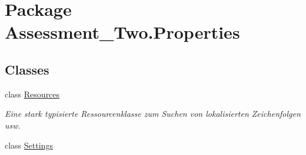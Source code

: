 \hypertarget{namespace_assessment___two_1_1_properties}{
\section{Package Assessment\_\-Two.Properties}
\label{namespace_assessment___two_1_1_properties}
}
\subsection*{Classes}
\begin{DoxyCompactItemize}
\item 
class \hyperlink{class_assessment___two_1_1_properties_1_1_resources}{Resources}
\begin{DoxyCompactList}\small\item\em Eine stark typisierte Ressourcenklasse zum Suchen von lokalisierten Zeichenfolgen usw. \item\end{DoxyCompactList}\item 
class \hyperlink{class_assessment___two_1_1_properties_1_1_settings}{Settings}
\end{DoxyCompactItemize}
